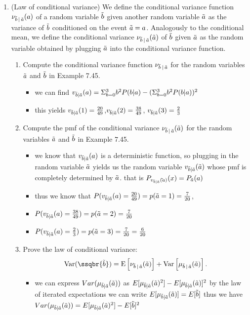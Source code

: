 \documentclass[12pt,twoside]{article}
\begin{document}
\begin{enumerate}
\item (Law of conditional variance) 
We define the conditional variance function $\nu_{\tilde{  b } \, | \, \tilde{  a }}(a)$ of a random variable $\tilde{  b }$ given another random variable $\tilde{  a }$ as the variance of $\tilde{  b }$ conditioned on the event $\tilde{  a } = a$. Analogously to the conditional mean, we define the conditional variance $\nu_{\tilde{  b } \, | \, \tilde{  a }}(\tilde{  a })$ of $\tilde{  b }$ given $\tilde{  a }$ as the random variable obtained by plugging $\tilde{  a }$ into the conditional variance function. 
\begin{enumerate}
\item Compute the conditional variance function $\nu_{\tilde{  b } \, | \, \tilde{  a }}$ for the random variables $\tilde{  a }$ and $\tilde{  b }$ in Example 7.45.
\begin{itemize}
\item we can find $v_{\Tilde{b}|\Tilde{a}}(a)=\Sigma_{b=0}^{3}b^2P(b|a)-(\Sigma_{b=0}^{3}b^2P(b|a))^2$
\item this yields $v_{\Tilde{b}|\Tilde{a}}(1)=\frac{20}{49}$,$v_{\Tilde{b}|\Tilde{a}}(2)=\frac{38}{49}$, $v_{\Tilde{b}|\Tilde{a}}(3)=\frac{2}{3}$
\end{itemize}
\item Compute the pmf of the conditional variance $\nu_{\tilde{  b } \, | \, \tilde{  a }}(\tilde{  a })$ for the random variables $\tilde{  a }$ and $\tilde{  b }$ in Example 7.45. 
\begin{itemize}
    \item we know that $v_{\Tilde{b}|\Tilde{a}}(a)$ is a deterministic function, so plugging in the random variable $\Tilde{a}$ yields us the random variable $v_{\Tilde{b}|\Tilde{a}}(\Tilde{a})$ whose pmf is completely determined by $\Tilde{a}$. that is $P_{v_{\Tilde{b}|\Tilde{a}}(\Tilde{}{a})}(x)=P_{\Tilde{a}}(a)$
    \item thus we know that $P(v_{\Tilde{b}|\Tilde{a}}(a)=\frac{20}{49})=p(\Tilde{a}=1)=\frac{7}{20}$,\item $P(v_{\Tilde{b}|\Tilde{a}}(a)=\frac{38}{49})=p(\Tilde{a}=2)=\frac{7}{20} $\item
    $P(v_{\Tilde{b}|\Tilde{a}}(a)=\frac{2}{3})=p(\Tilde{a}=3)=\frac{7}{20}=\frac{6}{20} $
\end{itemize}
\item Prove the law of conditional variance:
\begin{align}
\Var( \ssqbr{\rb} )= \E \sqbr{ \nu_{\rb \cnd \ra}(\ra) } + \Var \sqbr{ \mu_{\rb \cnd \ra}(\ra) }.
\end{align}
\begin{itemize}
    \item we can express $Var(\mu_{\Tilde{b}|\Tilde{a}}(\Tilde{a}))$ as $E[\mu_{\Tilde{b}|\Tilde{a}}(\Tilde{a})^2]-E[\mu_{\Tilde{b}|\Tilde{a}}(\Tilde{a})]^2$ by the law of iterated expectations we can write $E[\mu_{\Tilde{b}|\Tilde{a}}(\Tilde{a})]=E[\Tilde{b}]$ thus we have $Var(\mu_{\Tilde{b}|\Tilde{a}}(\Tilde{a}))=E[\mu_{\Tilde{b}|\Tilde{a}}(\Tilde{a})^2]-E[\Tilde{b}]^2$

\end{itemize}
\end{enumerate}
\end{enumerate}
\end{document}
